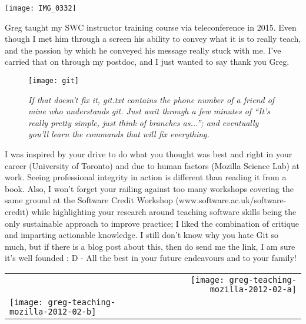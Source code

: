 \newpage
\pagestyle{plain}
\texttt{[image: IMG\_0332]}

Greg taught my SWC instructor training course via teleconference in 2015. Even
though I met him through a screen his ability to convey what it is to really
teach, and the passion by which he conveyed his message really stuck with me.
I've carried that on through my postdoc, and I just wanted to say thank you
Greg.


\newpage
\vspace*{\fill}

\begin{figure}[h!]
\begin{center}
\texttt{[image: git]}
\caption*{\textit{
If that doesn't fix it, git.txt contains the phone number of a friend
of mine who understands git. Just wait through a few minutes of
``It's really pretty simple, just think of branches as...''; and
eventually you'll learn the commands that will fix everything.}}
\end{center}
\end{figure}

I was inspired by your drive to do what you thought was best and right in your
career (University of Toronto) and due to human factors (Mozilla Science Lab)
at work. Seeing professional integrity in action is different than reading it
from a book. Also, I won't forget your railing against too many workshops
covering the same ground at the Software Credit Workshop
(www.software.ac.uk/software-credit) while highlighting your research around
teaching software skills being the only sustainable approach to improve
practice; I liked the combination of critique and imparting actionable
knowledge. I still don't know why you hate Git so much, but if there is a blog
post about this, then do send me the link, I am sure it's well founded  :  D  -
All the best in your future endeavours and to your family! 

\vspace*{\fill}

\newpage
\vspace*{\fill}

\begin{tabular*}{\textwidth}[t]{ l r }
    & \texttt{[image: greg-teaching-mozilla-2012-02-a]} \\
    \texttt{[image: greg-teaching-mozilla-2012-02-b]} & \\
\end{tabular*}

